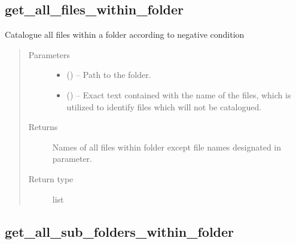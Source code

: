 \documentclass[letterpaper,10pt,english]{sphinxmanual}
\begin{document}
\subsection{get\_all\_files\_within\_folder}
\label{\detokenize{api/ucf.get_all_files_within_folder:get-all-files-within-folder}}\label{\detokenize{api/ucf.get_all_files_within_folder::doc}}

\begin{fulllineitems}
\label{\detokenize{api/ucf.get_all_files_within_folder:ucf.get_all_files_within_folder}}
Catalogue all files within a folder according to negative condition
\begin{quote}\begin{description}
\item[{Parameters}] \leavevmode\begin{itemize}
\item {} 
 () -- Path to the folder.

\item {} 
 () -- Exact text contained with the name of the files, which is
utilized to identify files which will not be catalogued.

\end{itemize}

\item[{Returns}] \leavevmode
Names of all files within folder except file names designated in
 parameter.

\item[{Return type}] \leavevmode
list

\end{description}\end{quote}

\end{fulllineitems}



\subsection{get\_all\_sub\_folders\_within\_folder}
\label{\detokenize{api/ucf.get_all_sub_folders_within_folder:get-all-sub-folders-within-folder}}\label{\detokenize{api/ucf.get_all_sub_folders_within_folder::doc}}
\end{document}

